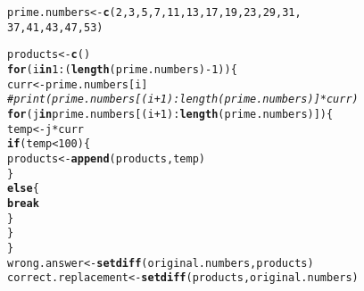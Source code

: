 \documentclass{article}\usepackage[]{graphicx}\usepackage[]{xcolor}
\makeatletter
\newcommand{\hlnum}[1]{\textcolor[rgb]{0.686,0.059,0.569}{#1}}%
\newcommand{\hlcom}[1]{\textcolor[rgb]{0.678,0.584,0.686}{\textit{#1}}}%
\newcommand{\hlopt}[1]{\textcolor[rgb]{0,0,0}{#1}}%
\newcommand{\hldef}[1]{\textcolor[rgb]{0.345,0.345,0.345}{#1}}%
\newcommand{\hlkwa}[1]{\textcolor[rgb]{0.161,0.373,0.58}{\textbf{#1}}}%
\newcommand{\hlkwb}[1]{\textcolor[rgb]{0.69,0.353,0.396}{#1}}%
\newcommand{\hlkwd}[1]{\textcolor[rgb]{0.737,0.353,0.396}{\textbf{#1}}}%
\newenvironment{kframe}{%
 \def\at@end@of@kframe{}%
 \ifinner\ifhmode%
  \def\at@end@of@kframe{\end{minipage}}%
  \begin{minipage}{\columnwidth}%
 \fi\fi%
 \def\FrameCommand##1{\hskip\@totalleftmargin \hskip-\fboxsep
 \colorbox{shadecolor}{##1}\hskip-\fboxsep
     \hskip-\linewidth \hskip-\@totalleftmargin \hskip\columnwidth}%
 \MakeFramed {\advance\hsize-\width
   \@totalleftmargin\z@ \linewidth\hsize
   \@setminipage}}%
 {\par\unskip\endMakeFramed%
 \at@end@of@kframe}
\newenvironment{knitrout}{}{} %
\makeatother
\begin{document}
\begin{enumerate}
\begin{knitrout}
\begin{kframe}
\begin{alltt}
\hldef{prime.numbers} \hlkwb{<-} \hlkwd{c}\hldef{(}\hlnum{2}\hldef{,}\hlnum{3}\hldef{,}\hlnum{5}\hldef{,}\hlnum{7}\hldef{,}\hlnum{11}\hldef{,}\hlnum{13}\hldef{,}\hlnum{17}\hldef{,}\hlnum{19}\hldef{,}\hlnum{23}\hldef{,}\hlnum{29}\hldef{,}\hlnum{31}\hldef{,}
                   \hlnum{37}\hldef{,}\hlnum{41}\hldef{,}\hlnum{43}\hldef{,}\hlnum{47}\hldef{,}\hlnum{53}\hldef{)}

\hldef{products} \hlkwb{<-} \hlkwd{c}\hldef{()}
\hlkwa{for}\hldef{(i} \hlkwa{in} \hlnum{1}\hlopt{:}\hldef{(}\hlkwd{length}\hldef{(prime.numbers)}\hlopt{-}\hlnum{1}\hldef{))\{}
  \hldef{curr} \hlkwb{<-} \hldef{prime.numbers[i]}
  \hlcom{# print(prime.numbers[(i+1):length(prime.numbers)] *curr)}
  \hlkwa{for}\hldef{(j} \hlkwa{in} \hldef{prime.numbers[(i}\hlopt{+}\hlnum{1}\hldef{)}\hlopt{:}\hlkwd{length}\hldef{(prime.numbers)])\{}
    \hldef{temp} \hlkwb{<-} \hldef{j}\hlopt{*}\hldef{curr}
    \hlkwa{if}\hldef{(temp} \hlopt{<} \hlnum{100}\hldef{)\{}
      \hldef{products} \hlkwb{<-} \hlkwd{append}\hldef{(products,temp)}
    \hldef{\}}
    \hlkwa{else}\hldef{\{}
      \hlkwa{break}
    \hldef{\}}
  \hldef{\}}
\hldef{\}}
\hldef{wrong.answer} \hlkwb{<-} \hlkwd{setdiff}\hldef{(original.numbers,products)}
\hldef{correct.replacement} \hlkwb{<-} \hlkwd{setdiff}\hldef{(products,original.numbers)}
\end{alltt}
\end{kframe}
\end{knitrout}
\end{enumerate}


\end{document}
